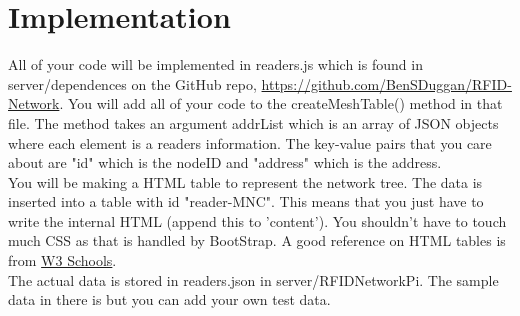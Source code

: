 \documentclass[12pt]{article}
\begin{document}
\section{Implementation}
All of your code will be implemented in readers.js which is found in server/dependences on the GitHub repo, \url{https://github.com/BenSDuggan/RFID-Network}.  You will add all of your code to the createMeshTable() method in that file.  The method takes an argument addrList which is an array of JSON objects where each element is a readers information.  The key-value pairs that you care about are "id" which is the nodeID and "address" which is the address.\\

You will be making a HTML table to represent the network tree.  The data is inserted into a table with id "reader-MNC".  This means that you just have to write the internal HTML (append this to 'content').  You shouldn't have to touch much CSS as that is handled by BootStrap.  A good reference on HTML tables is from \href{https://www.w3schools.com/html/html_tables.asp}{W3 Schools}.\\

The actual data is stored in readers.json in server/RFIDNetworkPi.  The sample data in there is but you can add your own test data.\\
\end{document}
